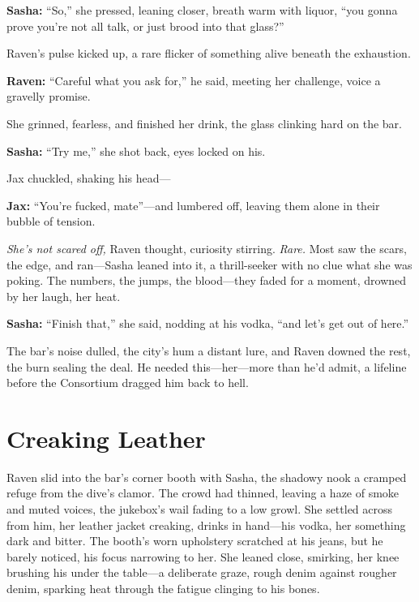 \documentclass[12pt]{book}
\begin{document}
\vspace{0.5em}
\textbf{Sasha:} “So,” she pressed, leaning closer, breath warm with liquor, “you gonna prove you’re not all talk, or just brood into that glass?”

Raven’s pulse kicked up, a rare flicker of something alive beneath the exhaustion.

\vspace{0.5em}
\textbf{Raven:} “Careful what you ask for,” he said, meeting her challenge, voice a gravelly promise.

She grinned, fearless, and finished her drink, the glass clinking hard on the bar.

\vspace{0.5em}
\textbf{Sasha:} “Try me,” she shot back, eyes locked on his.

Jax chuckled, shaking his head—

\vspace{0.5em}
\textbf{Jax:} “You’re fucked, mate”—and lumbered off, leaving them alone in their bubble of tension.

\textit{She’s not scared off,} Raven thought, curiosity stirring. \textit{Rare.} Most saw the scars, the edge, and ran—Sasha leaned into it, a thrill-seeker with no clue what she was poking. The numbers, the jumps, the blood—they faded for a moment, drowned by her laugh, her heat.

\vspace{0.5em}
\textbf{Sasha:} “Finish that,” she said, nodding at his vodka, “and let’s get out of here.”

The bar’s noise dulled, the city’s hum a distant lure, and Raven downed the rest, the burn sealing the deal. He needed this—her—more than he’d admit, a lifeline before the Consortium dragged him back to hell.

\section{Creaking Leather}

Raven slid into the bar’s corner booth with Sasha, the shadowy nook a cramped refuge from the dive’s clamor. The crowd had thinned, leaving a haze of smoke and muted voices, the jukebox’s wail fading to a low growl. She settled across from him, her leather jacket creaking, drinks in hand—his vodka, her something dark and bitter. The booth’s worn upholstery scratched at his jeans, but he barely noticed, his focus narrowing to her. She leaned close, smirking, her knee brushing his under the table—a deliberate graze, rough denim against rougher denim, sparking heat through the fatigue clinging to his bones.
\end{document}
